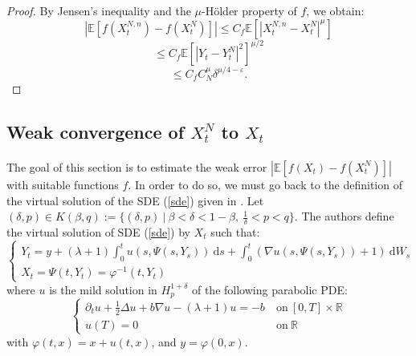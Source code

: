 \documentclass[12pt]{article}
\newcommand{\R}{\mathbb{R}}
\newcommand{\E}{\mathbb{E}}
\newcommand{\di}{\mathrm{d}}
\begin{document}
        \begin{proof}
            By Jensen's inequality and the $\mu$-Hölder property of $f$, we obtain:
            \begin{equation*}
            \left|\E\left[f\left(X_t^{N,n}\right)-f\left(X_t^N\right)\right]\right| \leq C_f  \E\left[\left|X_t^{N,n}-X_t^N\right|^\mu\right]
            \end{equation*}
            \begin{equation*}
             \leq  C_f  \E\left[\left|Y_t-Y_t^N\right|^2\right]^{\mu/2}
            \end{equation*}
            \begin{equation*}
            \leq C_f  C_N^\mu\delta^{\mu/4-\varepsilon}.
            \end{equation*}
        \end{proof}
    
    \subsection{Weak convergence of $X^{N}_t$ to $X_t$}
        \paragraph{}
        The goal of this section is to estimate the weak error $\left|\E\left[f\left(X_t\right)-f\left(X_t^N\right)\right]\right|$ with suitable functions $f$. In order to do so, we must go back to the definition of the virtual solution of the SDE (\ref{sde}) given in \cite{Fla-Iss-Rus-2017}. Let $(\delta,p)\in K(\beta,q):=\{(\delta,p)\ |\ \beta<\delta<1-\beta,\ \frac{1}{\delta}<p<q\}$. The authors define the virtual solution of SDE (\ref{sde}) by $X_t$ such that:
        \begin{equation}\label{virtual}
        \begin{cases}
        Y_t = y + (\lambda+1)\int_0^t u(s,\Psi\left(s,Y_s\right))\ \di s +\int_0^t (\nabla u(s,\Psi\left(s,Y_s\right))+1)\ \di W_s \\X_t = \Psi(t,Y_t) = \varphi^{-1}(t,Y_t)
        \end{cases}
        \end{equation}
        where $u$ is the mild solution in $H_p^{1+\delta}$ of the following parabolic PDE:
        \begin{equation}\label{pde}
        \begin{cases}
        \partial_t u + \frac{1}{2}\Delta u + b\nabla u - (\lambda+1)u = -b\ &\mathrm{on}\ [0,T]\times\R\\
        u(T) = 0\ &\mathrm{on}\ \R
        \end{cases}
        \end{equation}
        with $\varphi(t,x) = x + u(t,x)$, and $y=\varphi(0,x)$.
        
\end{document}

